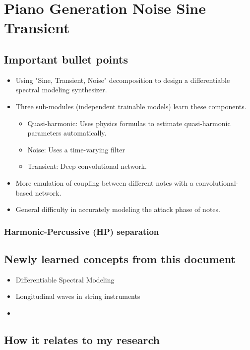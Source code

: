 \section{Piano Generation Noise Sine Transient}

\cite{sitranoPiano}

\subsection{Important bullet points}

\begin{itemize}
    \item Using "Sine, Transient, Noise" decomposition to design a differentiable spectral modeling synthesizer.
    \item Three sub-modules (independent trainable models) learn these components.
    \begin{itemize}
        \item Quasi-harmonic: Uses physics formulas to estimate quasi-harmonic parameters automatically.
        \item Noise: Uses a time-varying filter
        \item Transient: Deep convolutional network. 
    \end{itemize}
    \item More emulation of coupling between different notes with a convolutional-based network.
    \item General difficulty in accurately modeling the attack phase of notes.
\end{itemize}

\subsubsection{Harmonic-Percussive (HP) separation}

\subsection{Newly learned concepts from this document}

\begin{itemize}
    \item Differentiable Spectral Modeling
    \item Longitudinal waves in string instruments
    \item 
\end{itemize}

\subsection{How it relates to my research}